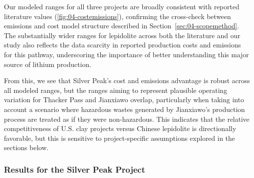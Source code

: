 Our modeled ranges for all three projects are broadly consistent with reported literature values (\ref{fig:04-costemissions}), confirming the cross-check between emissions and cost model structure described in Section~\ref{sec:04-scopemethod}. The substantially wider ranges for lepidolite across both the literature and our study also reflects the data scarcity in reported production costs and emissions for this pathway, underscoring the importance of better understanding this major source of lithium production.

From this, we see that Silver Peak's cost and emissions advantage is robust across all modeled ranges, but the ranges aiming to represent plausible operating variation for Thacker Pass and Jianxiawo overlap, particularly when taking into account a scenario where hazardous wastes generated by Jianxiawo's production process are treated as if they were non-hazardous. This indicates that the relative competitiveness of U.S. clay projects versus Chinese lepidolite is directionally favorable, but this is sensitive to project-specific assumptions explored in the sections below. 

\subsubsection{Results for the Silver Peak Project}\label{sec:04-silverpeak}


